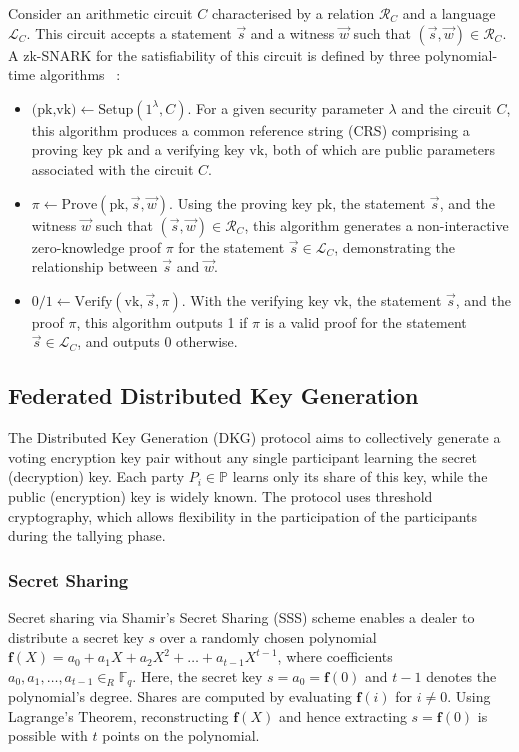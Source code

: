 \documentclass[runningheads]{llncs}
\begin{document}
Consider an arithmetic circuit $C$ characterised by a relation $\mathcal{R}_C$ and a language $\mathcal{L}_C$. This circuit accepts a statement $\vec{s}$ and a witness $\vec{w}$ such that $(\vec{s}, \vec{w}) \in \mathcal{R}_C$. A zk-SNARK for the satisfiability of this circuit is defined by three polynomial-time algorithms ~\cite{grothSizePairingbasedNoninteractive2016,parnoPinocchioNearlyPractical2013}:
\begin{itemize}
    \item $\textrm{(pk,vk)} \gets \textrm{Setup}(1^\lambda,C)$. For a given security parameter $\lambda$ and the circuit $C$, this algorithm produces a common reference string (CRS) comprising a proving key $\textrm{pk}$ and a verifying key $\textrm{vk}$, both of which are public parameters associated with the circuit $C$.
    \item $\pi \gets \textrm{Prove}(\textrm{pk}, \vec{s}, \vec{w})$. Using the proving key $\textrm{pk}$, the statement $\vec{s}$, and the witness $\vec{w}$ such that $(\vec{s}, \vec{w}) \in \mathcal{R}_C$, this algorithm generates a non-interactive zero-knowledge proof $\pi$ for the statement $\vec{s} \in \mathcal{L}_C$, demonstrating the relationship between $\vec{s}$ and $\vec{w}$.
    \item $0/1 \gets \textrm{Verify}(\textrm{vk}, \vec{s}, \pi)$. With the verifying key $\textrm{vk}$, the statement $\vec{s}$, and the proof $\pi$, this algorithm outputs 1 if $\pi$ is a valid proof for the statement $\vec{s} \in \mathcal{L}_C$, and outputs 0 otherwise.
\end{itemize}


\subsection{Federated Distributed Key Generation}
The Distributed Key Generation (DKG) protocol aims to collectively generate a voting encryption key pair without any single participant learning the secret (decryption) key. Each party $P_i \in \mathbb{P}$ learns only its share of this key, while the public (encryption) key is widely known. The protocol uses threshold cryptography, which allows flexibility in the participation of the participants during the tallying phase.

\subsubsection*{Secret Sharing}
Secret sharing via Shamir's Secret Sharing (SSS) scheme enables a dealer to distribute a secret key $s$ over a randomly chosen polynomial $\mathbf{f}(X) = a_0 + a_1X + a_2X^2 + \dots + a_{t-1}X^{t-1}$, where coefficients $a_0,a_1,\dots,a_{t-1} \in_R \mathbb{F}_q$. Here, the secret key $s=a_0=\mathbf{f}(0)$ and $t-1$ denotes the polynomial's degree. Shares are computed by evaluating $\mathbf{f}(i)$ for $i \neq 0$. Using Lagrange's Theorem, reconstructing $\mathbf{f}(X)$ and hence extracting $s = \mathbf{f}(0)$ is possible with $t$ points on the polynomial.
\end{document}
